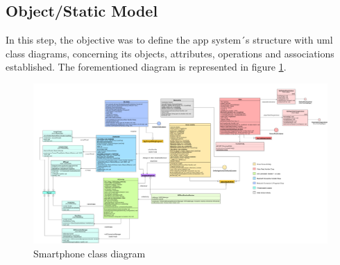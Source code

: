 \subsection{Object/Static Model}
In this step, the objective was to define the app system´s structure with \gls{uml} class diagrams, concerning its objects, attributes, operations and associations established.  The forementioned diagram is represented in figure \ref{fig:uml-android}.
%
\begin{figure}[!ht]
\centering
\includegraphics[width=\textwidth]{img/smartphone-static-diagram.png}
\caption{\label{fig:uml-android}Smartphone class diagram}
\end{figure}
%
